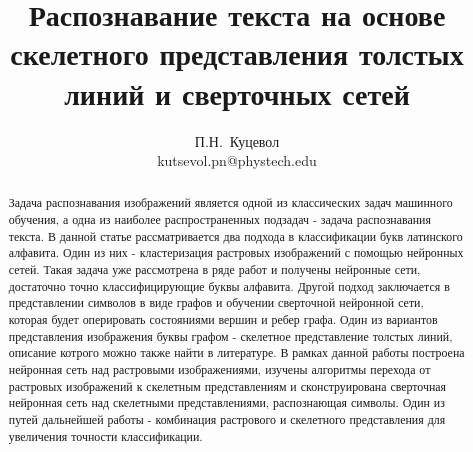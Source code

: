 \documentclass[10pt,a4paper]{llncs}
\begin{document}
\title{ Распознавание текста на основе скелетного представления толстых линий и сверточных сетей }
\author{
	П.Н.~Куцевол \\
	kutsevol.pn@phystech.edu\\
}

\maketitle

\begin{abstract} 
	Задача распознавания изображений является одной из классических задач машинного обучения, а одна из наиболее распространенных подзадач - задача распознавания текста. В данной статье рассматривается два подхода в классификации букв латинского алфавита. Один из них - кластеризация растровых изображений с помощью нейронных сетей. Такая задача уже рассмотрена в ряде работ и получены нейронные сети, достаточно точно классифицирующие буквы алфавита. Другой подход заключается в представлении символов в виде графов и обучении сверточной нейронной сети, которая будет оперировать состояниями вершин и ребер графа. Один из вариантов представления изображения буквы графом - скелетное представление толстых линий, описание котрого можно также найти в литературе. В рамках данной работы построена нейронная сеть над растровыми изображениями, изучены алгоритмы перехода от растровых изображений к скелетным представлениям и сконструирована сверточная нейронная сеть над скелетными представлениями, распознающая символы. Один из путей дальнейшей работы - комбинация растрового и скелетного представления для увеличения точности классификации.
\end{abstract}
\end{document}
